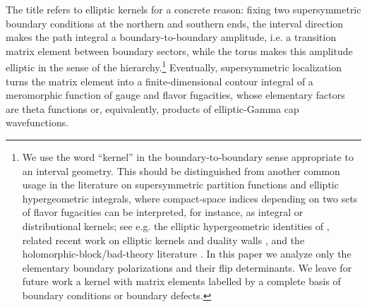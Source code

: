 \documentclass[11pt,a4paper]{article}
\makeatletter
\numberwithin{equation}{section}
\theoremstyle{plain}
\theoremstyle{definition}
\theoremstyle{remark}
\newcommand{\cyl}{\mathsf{Cyl}}
\newcounter{mathrecordid}
\newcommand{\mathboxbegin}[1]{%
  \stepcounter{mathrecordid}%
  \immediate\write\mathrecords{\themathrecordid,#1}%
  \special{pdf:bann << /Type /Annot /Subtype /Link /Border [0 0 0]
    /MathBoxID \themathrecordid /F 2
    /A << /S /URI /URI (urn:mathbox:\themathrecordid) >> >>}}
\newcommand{\mathboxinlineplain}[1]{$#1$}
\newcommand{\mathboxinline}[1]{%
  $\mathboxbegin{inline}%
  \special{pdf:literal direct /MathBoxBegin\themathrecordid\space MP}%
  #1\special{pdf:literal direct /MathBoxEnd\themathrecordid\space MP}%
  \special{pdf:eann}$}
\newcommand{\recordmath}{%
  \ifmeasuring@\expandafter\mathboxinlineplain
  \else\expandafter\mathboxinline\fi}
\makeatother
\begin{document}
The title refers to elliptic kernels for a concrete reason: fixing two supersymmetric boundary conditions at the northern and southern ends, the interval direction makes the path integral a boundary-to-boundary amplitude, i.e. a transition matrix element between boundary sectors, while the torus makes this amplitude elliptic in the sense of the \recordmath{\cyl\times pt/S^1/T^2} hierarchy.\footnote{We use the word ``kernel'' in the boundary-to-boundary sense appropriate to an interval geometry. This should be distinguished from another common usage in the literature on supersymmetric partition functions and elliptic hypergeometric integrals, where compact-space indices depending on two sets of flavor fugacities can be interpreted, for instance, as integral or distributional kernels; see e.g. the elliptic hypergeometric identities of \cite{Spiridonov:2001ig,Rains:2003}, related recent work on elliptic kernels and duality walls \cite{Bottini:2021vms,Benvenuti:2024mpn}, and the holomorphic-block/bad-theory literature \cite{Pasquetti:2011fj,Beem:2012mb,Nieri:2015yia,Giacomelli:2023zkk,Giacomelli:2024laq}. In this paper we analyze only the elementary \recordmath{D/R} boundary polarizations and their flip determinants. We leave for future work a  kernel with matrix elements labelled by a complete basis of boundary conditions or boundary defects.} Eventually, supersymmetric localization turns the matrix element into a finite-dimensional contour integral of a meromorphic function of gauge and flavor fugacities, whose elementary factors are theta functions or, equivalently, products of elliptic-Gamma cap wavefunctions.
\end{document}
